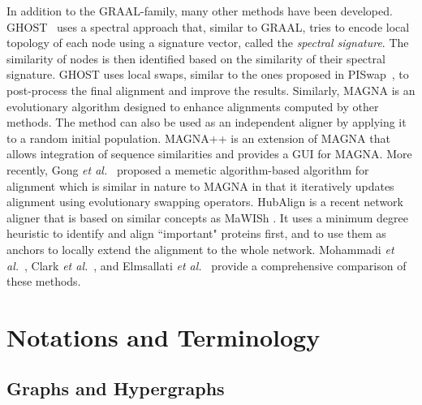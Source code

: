 \documentclass[10pt, journal, compsoc, final]{IEEEtran}
\begin{document}
In addition to the GRAAL-family, many other methods have been developed. GHOST~\cite{GHOST} uses a spectral approach that, similar to GRAAL, tries to encode local topology of each node using a signature vector, called the \textit{spectral signature}. The similarity of nodes is then identified based on the similarity of their spectral signature. GHOST uses local swaps, similar to the ones proposed in PISwap~\cite{PISWAP}, to post-process the final alignment and improve the results. Similarly, MAGNA \cite{MAGNA} is an evolutionary algorithm designed to enhance alignments computed by other methods. The method can also be used as an independent aligner by applying it to a random initial population. MAGNA++ \cite{MAGNA++} is an extension of MAGNA that allows integration of sequence similarities and provides a GUI for MAGNA. More recently, Gong \textit{et al.}~\cite{Gong2015} proposed a memetic algorithm-based algorithm for alignment which is similar in nature to MAGNA in that it iteratively updates alignment using evolutionary swapping operators.
HubAlign \cite{HubAlign} is a recent network aligner that is based on similar concepts as MaWISh \cite{MAWISH}. It uses a minimum degree heuristic to identify and align ``important" proteins first, and to use them as anchors to locally extend the alignment to the whole network. Mohammadi \textit{et al.}~\cite{AlignmentChapter}, Clark \textit{et al.}~\cite{Clark2014}, and Elmsallati \textit{et al.}~\cite{Elmsallati2015} provide a comprehensive comparison of these methods.


\section{Notations and Terminology}
\subsection{Graphs and Hypergraphs}
\end{document}

